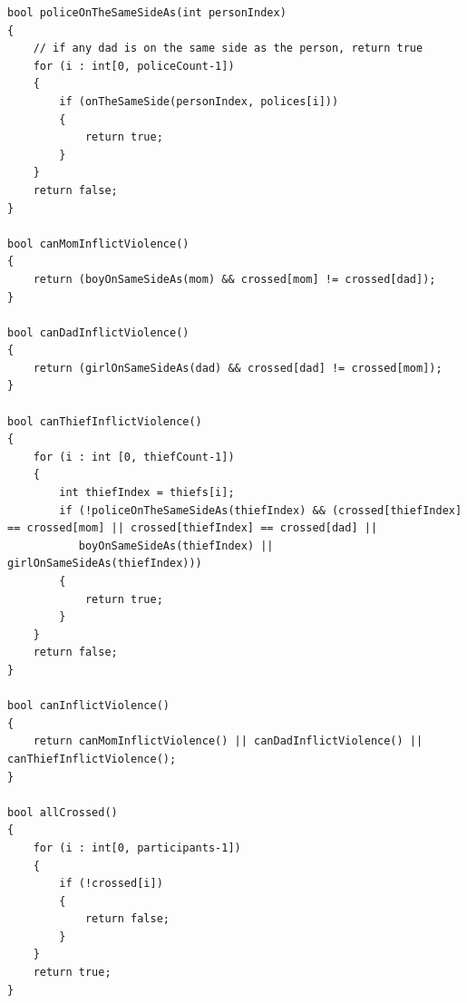 \documentclass[a4paper,12pt]{article}
\begin{document}
\begin{lstlisting}
bool policeOnTheSameSideAs(int personIndex)
{
    // if any dad is on the same side as the person, return true
    for (i : int[0, policeCount-1])
    {
        if (onTheSameSide(personIndex, polices[i]))
        {
            return true;
        }
    }
    return false;
}

bool canMomInflictViolence()
{
    return (boyOnSameSideAs(mom) && crossed[mom] != crossed[dad]);
}

bool canDadInflictViolence()
{
    return (girlOnSameSideAs(dad) && crossed[dad] != crossed[mom]);
}

bool canThiefInflictViolence()
{
    for (i : int [0, thiefCount-1])
    {
        int thiefIndex = thiefs[i];
        if (!policeOnTheSameSideAs(thiefIndex) && (crossed[thiefIndex] == crossed[mom] || crossed[thiefIndex] == crossed[dad] ||
           boyOnSameSideAs(thiefIndex) || girlOnSameSideAs(thiefIndex)))
        {
            return true;
        }
    }
    return false;
}

bool canInflictViolence()
{
    return canMomInflictViolence() || canDadInflictViolence() || canThiefInflictViolence();
}

bool allCrossed()
{
    for (i : int[0, participants-1])
    {
        if (!crossed[i])
        {
            return false;
        }
    }
    return true;
}
\end{lstlisting}
\end{document}
